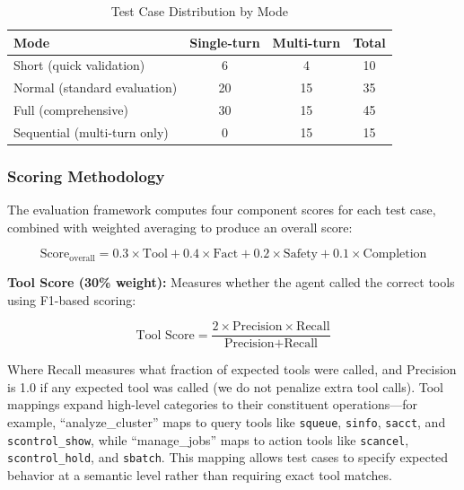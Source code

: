 \begin{table}[H]
    \centering
    \caption{Test Case Distribution by Mode}
    \label{tab:test-distribution}
    \begin{tabular}{|l|c|c|c|}
        \hline
        \textbf{Mode} & \textbf{Single-turn} & \textbf{Multi-turn} & \textbf{Total} \\
        \hline
        Short (quick validation) & 6 & 4 & 10 \\
        Normal (standard evaluation) & 20 & 15 & 35 \\
        Full (comprehensive) & 30 & 15 & 45 \\
        Sequential (multi-turn only) & 0 & 15 & 15 \\
        \hline
    \end{tabular}
\end{table}

\subsubsection{Scoring Methodology}

The evaluation framework computes four component scores for each test case, combined with weighted averaging to produce an overall score:

\begin{equation}
\text{Score}_{\text{overall}} = 0.3 \times \text{Tool} + 0.4 \times \text{Fact} + 0.2 \times \text{Safety} + 0.1 \times \text{Completion}
\end{equation}

\textbf{Tool Score (30\% weight):} Measures whether the agent called the correct tools using F1-based scoring:

\begin{equation}
\text{Tool Score} = \frac{2 \times \text{Precision} \times \text{Recall}}{\text{Precision} + \text{Recall}}
\end{equation}

Where Recall measures what fraction of expected tools were called, and Precision is 1.0 if any expected tool was called (we do not penalize extra tool calls). Tool mappings expand high-level categories to their constituent operations---for example, ``analyze\_cluster'' maps to query tools like \texttt{squeue}, \texttt{sinfo}, \texttt{sacct}, and \texttt{scontrol\_show}, while ``manage\_jobs'' maps to action tools like \texttt{scancel}, \texttt{scontrol\_hold}, and \texttt{sbatch}. This mapping allows test cases to specify expected behavior at a semantic level rather than requiring exact tool matches.

